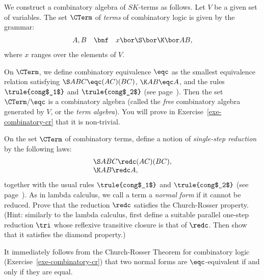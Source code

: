 \documentclass[12pt]{article}
\begin{document}
\begin{example}\label{exa-sk-term-alg}
  We construct a combinatory algebra of $SK$-terms as follows.  Let
  $V$ be a given set of variables. The set $\CTerm$ of {\em terms}
  of combinatory logic is given by the grammar:
  \[   \begin{array}{lll}
    A,B &\bnf& x\bor \S\bor \K\bor AB,
  \end{array}
  \]
  where $x$ ranges over the elements of $V$.
  
  On $\CTerm$, we define combinatory equivalence $\eqc$ as the
  smallest equivalence relation satisfying $\S ABC \eqc (AC)(BC)$, $\K
  AB \eqc A$, and the rules $\trule{cong$_1$}$ and $\trule{cong$_2$}$
  (see page~\pageref{page-def-beta}). Then the set $\CTerm/{\eqc}$ is a
  combinatory algebra (called the {\em free} combinatory algebra
  generated by $V$, or the {\em term algebra}). You will prove in
  Exercise~\ref{exe-combinatory-cr} that it is non-trivial.
\end{example}


\begin{exercise}\label{exe-combinatory-cr}
  On the set $\CTerm$ of combinatory terms, define a notion of {\em
    single-step reduction} by the following laws:
  \[ \begin{array}{l}
    \S ABC \redc (AC)(BC), \\
    \K AB \redc A,\\
  \end{array}
  \]
  together with the usual rules $\trule{cong$_1$}$ and
  $\trule{cong$_2$}$ (see page~\pageref{page-def-beta}). As in lambda
  calculus, we call a term a {\em normal form} if it cannot be
  reduced. Prove that the reduction $\redc$ satisfies the
  Church-Rosser property. (Hint: similarly to the lambda calculus,
  first define a suitable parallel one-step reduction $\tri$ whose
  reflexive transitive closure is that of $\redc$. Then show that it
  satisfies the diamond property.)
\end{exercise}

\begin{corollary}\label{cor-sk-nf}
  It immediately follows from the Church-Rosser Theorem for
  combinatory logic (Exercise~\ref{exe-combinatory-cr}) that two
  normal forms are $\eqc$-equivalent if and only if they are equal.
\end{corollary}
\end{document}
